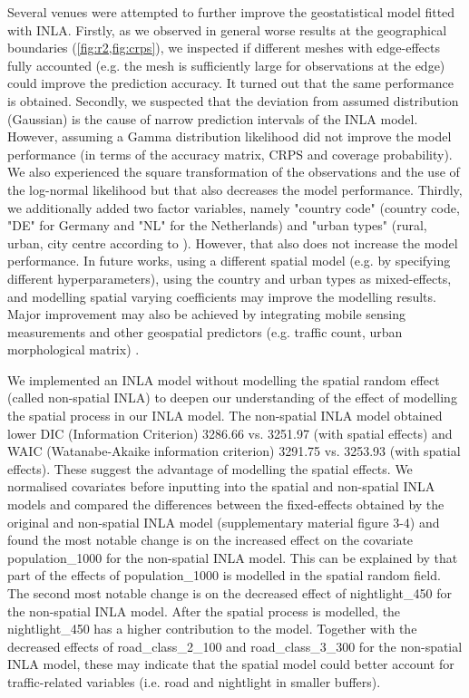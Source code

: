 \documentclass{article}
\begin{document}
Several venues were attempted to further improve the geostatistical model fitted with INLA. Firstly, as we observed in general worse results at the geographical boundaries (\cref{fig:r2,fig:crps}), we inspected if different meshes with edge-effects fully accounted (e.g. the mesh is sufficiently large for observations at the edge) could improve the prediction accuracy. It turned out that the same performance is obtained. Secondly, we suspected that the deviation from assumed distribution (Gaussian) is the cause of narrow prediction intervals of the INLA model. However, assuming a Gamma distribution likelihood did not improve the model performance (in terms of the accuracy matrix, CRPS and coverage probability). We also experienced the square transformation of the observations and the use of the log-normal likelihood but that also decreases the model performance. Thirdly, we additionally added two factor variables, namely "country code" (country code, "DE" for Germany and "NL" for the Netherlands) and "urban types" (rural, urban, city centre according to \citep{urbantype}). However, that also does not increase the model performance. In future works, using a different spatial model (e.g. by specifying different hyperparameters), using the country and urban types as mixed-effects, and modelling spatial varying coefficients may improve the modelling results. Major improvement may also be achieved by integrating mobile sensing measurements and other geospatial predictors (e.g. traffic count, urban morphological matrix) \citep{moragaetal17}.

  
We implemented an INLA model without modelling the spatial random effect (called non-spatial INLA) to deepen our understanding of the effect of modelling the spatial process in our INLA model. The non-spatial INLA model obtained lower DIC (Information Criterion) 3286.66 vs. 3251.97 (with spatial effects) and WAIC (Watanabe-Akaike information criterion) 3291.75 vs. 3253.93 (with spatial effects). These suggest the advantage of modelling the spatial effects. We normalised covariates before inputting into the spatial and non-spatial INLA models and compared the differences between the fixed-effects obtained by the original and non-spatial INLA model (supplementary material figure 3-4) and found the most notable change is on the increased effect on the covariate population\_1000 for the non-spatial INLA model. This can be explained by that part of the effects of population\_1000 is modelled in the spatial random field. The second most notable change is on the decreased effect of nightlight\_450 for the non-spatial INLA model. After the spatial process is modelled, the nightlight\_450 has a higher contribution to the model. Together with the decreased effects of road\_class\_2\_100 and road\_class\_3\_300 for the non-spatial INLA model, these may indicate that the spatial model could better account for traffic-related variables (i.e. road and nightlight in smaller buffers).
\end{document}
